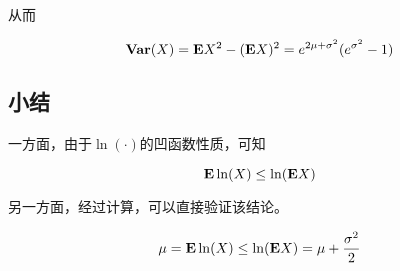 从而

\begin{equation}
    \mathbf{Var}(X) = \mathbf{E} X^2 - (\mathbf{E} X )^2 = e^{2\mu+\sigma^2}(e^{\sigma^2}-1)
\end{equation}

\subsection{小结}

一方面，由于$\ln(\cdot)$的凹函数性质，可知

\begin{equation}
    \mathbf{E} \ln(X) \leq \ln(\mathbf{E} X)
\end{equation}

另一方面，经过计算，可以直接验证该结论。

\begin{equation}
    \mu = \mathbf{E} \ln(X) \leq \ln(\mathbf{E} X) = \mu + \frac{\sigma^2}{2}
\end{equation}